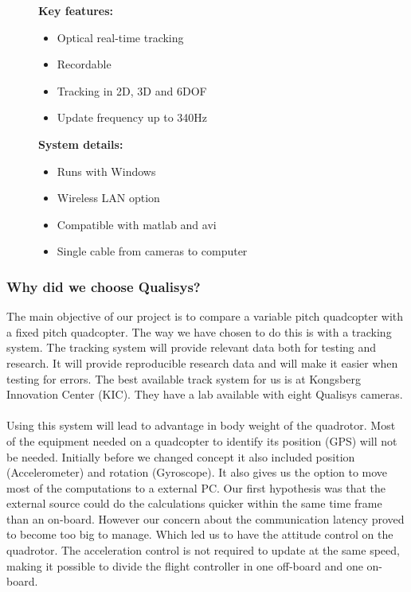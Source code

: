 \begin{figure}[h]
     \begin{minipage}[t]{0.45\textwidth}
    \textbf{Key features:}
        \begin{itemize}
            \item Optical real-time tracking
            \item Recordable
            \item Tracking in 2D, 3D and 6DOF
            \item Update frequency up to 340Hz
        \end{itemize}
     \end{minipage}
        \hfill
    \begin{minipage}[t]{0.45\textwidth}
        \textbf{System details:}
        \begin{itemize}
            \item Runs with Windows
            \item Wireless LAN option
            \item Compatible with matlab and avi 
            \item Single cable from cameras to computer
        \end{itemize}
    \end{minipage}
\end{figure}

\vspace*{0.03cm}
\subsubsection{Why did we choose Qualisys?}
The main objective of our project is to compare a variable pitch quadcopter with a fixed pitch quadcopter. The way we have chosen to do this is with a tracking system. The tracking system will provide relevant data both for testing and research. It will provide reproducible research data and will make it easier when testing for errors. The best available track system for us is at Kongsberg Innovation Center (KIC). They have a lab available with eight Qualisys cameras. \\
\\
Using this system will lead to advantage in body weight of the quadrotor. Most of the equipment needed on a quadcopter to identify its position (GPS) will not be needed. Initially before we changed concept it also included position (Accelerometer) and rotation (Gyroscope). It also gives us the option to move most of the computations to a external PC. Our first hypothesis was that the external source could do the calculations quicker within the same time frame than an on-board. However our concern about the communication latency proved to become too big to manage. Which led us to have the attitude control on the quadrotor. The acceleration control is not required to update at the same speed, making it possible to divide the flight controller in one off-board and one on-board. \\
